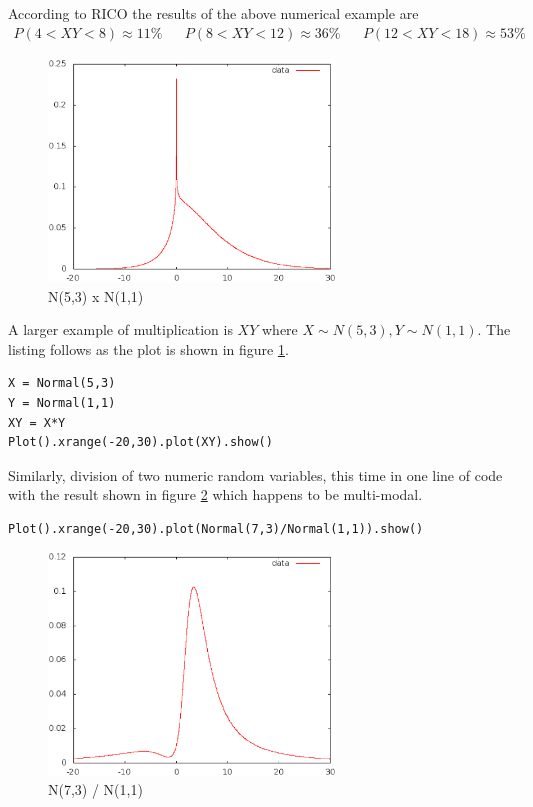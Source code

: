 According to RICO the results of the above numerical example are
\begin{align*}
P(4 < XY < 8) \approx 11\% && P(8 < XY < 12) \approx 36\% && P(12 < XY < 18) \approx 53\%
\end{align*}

\begin{figure}
  \centering
  \includegraphics[width=3in]{Images/N53xN11.eps}
  \caption[N(5,3) x N(1,1)]
          {N(5,3) x N(1,1)}
  \label{fig:N53xN11}
\end{figure}

A larger example of multiplication is $XY$ where $X \sim N(5,3), Y \sim N(1,1)$. The listing follows as the plot is shown in figure \ref{fig:N53xN11}.
\begin{lstlisting}
X = Normal(5,3)
Y = Normal(1,1)
XY = X*Y
Plot().xrange(-20,30).plot(XY).show()
\end{lstlisting}

Similarly, division of two numeric random variables, this time in one line of code with the result shown in figure \ref{fig:N73_N11} which happens to be multi-modal. 
\begin{lstlisting}
Plot().xrange(-20,30).plot(Normal(7,3)/Normal(1,1)).show()
\end{lstlisting}

\begin{figure}
  \centering
  \includegraphics[width=3in]{Images/N73_N11.eps}
  \caption[N(7,3) / N(1,1)]
          {N(7,3) / N(1,1)}
  \label{fig:N73_N11}
\end{figure}


